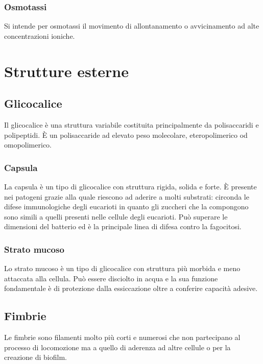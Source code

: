 		\subsubsection{Osmotassi}
		Si intende per osmotassi il movimento di allontanamento o avvicinamento ad alte concentrazioni ioniche.

\section{Strutture esterne}

	\subsection{Glicocalice}
	Il glicocalice \`e una struttura variabile costituita principalmente da polisaccaridi e polipeptidi.
	\`E un polisaccaride ad elevato peso molecolare, eteropolimerico od omopolimerico.

		\subsubsection{Capsula}
		La capsula \`e un tipo di glicocalice con struttura rigida, solida e forte.
		\`E presente nei patogeni grazie alla quale riescono ad aderire a molti substrati: circonda le difese immunologiche degli eucarioti in quanto gli zuccheri che la compongono sono simili a quelli presenti nelle cellule degli eucarioti.
		Pu\`o superare le dimensioni del batterio ed \`e la principale linea di difesa contro la fagocitosi.

		\subsubsection{Strato mucoso}
		Lo strato mucoso \`e un tipo di glicocalice con struttura pi\`u morbida e meno attaccata alla cellula.
		Pu\`o essere disciolto in acqua e la sua funzione fondamentale \`e di protezione dalla essiccazione oltre a conferire capacit\`a adesive.

	\subsection{Fimbrie}
	Le fimbrie sono filamenti molto pi\`u corti e numerosi che non partecipano al processo di locomozione ma a quello di aderenza ad altre cellule o per la creazione di biofilm.

